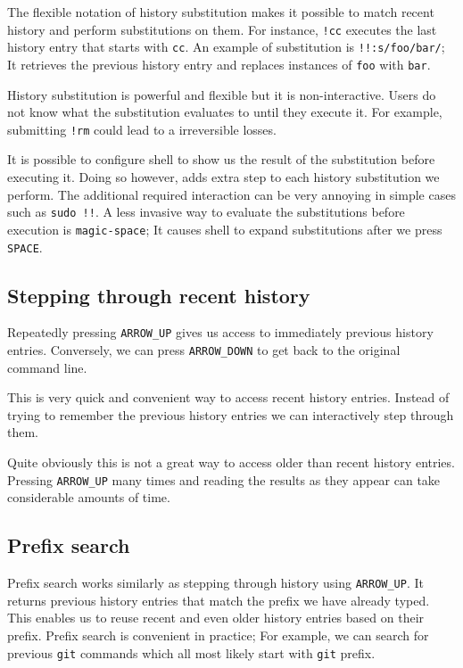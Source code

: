 The flexible notation of history substitution makes it possible to match recent history and perform substitutions on them. For instance, \verb|!cc| executes the last history entry that starts with \verb|cc|. An example of substitution is \verb|!!:s/foo/bar/|; It retrieves the previous history entry and replaces instances of \verb|foo| with \verb|bar|.

History substitution is powerful and flexible but it is non-interactive. Users do not know what the substitution evaluates to until they execute it. For example, submitting \verb|!rm| could lead to a irreversible losses.

It is possible to configure shell to show us the result of the substitution before executing it. Doing so however, adds extra step to each history substitution we perform. The additional required interaction can be very annoying in simple cases such as \verb|sudo !!|. A less invasive way to evaluate the substitutions before execution is \verb|magic-space|; It causes shell to expand substitutions after we press \verb|SPACE|.

\subsection{Stepping through recent history}

Repeatedly pressing \verb|ARROW_UP| gives us access to immediately previous history entries. Conversely, we can press \verb|ARROW_DOWN| to get back to the original command line. 

This is very quick and convenient way to access recent history entries. Instead of trying to remember the previous history entries we can interactively step through them.

Quite obviously this is not a great way to access older than recent history entries. Pressing \verb|ARROW_UP| many times and reading the results as they appear can take considerable amounts of time.

\subsection{Prefix search}

Prefix search works similarly as stepping through history using \verb|ARROW_UP|. It returns previous history entries that match the prefix we have already typed. 
This enables us to reuse recent and even older history entries based on their prefix. Prefix search is convenient in practice; For example, we can search for previous \verb|git| commands which all most likely start with \verb|git| prefix.

